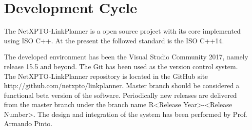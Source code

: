 
\chapter{Development Cycle}

The NetXPTO-LinkPlanner is a open source project with its core implemented using ISO C++.
At the present the followed standard is the ISO C++14.


The developed environment has been the Visual Studio Community 2017, namely release 15.5 and beyond.
The Git has been used as the version control system.
The NetXPTO-LinkPlanner repository is located in the GitHub site http://github.com/netxpto/linkplanner.
Master branch should be considered a functional beta version of the software.
Periodically new releases are delivered from the master branch under the branch name R<Release Year>-<Release Number>.
The design and integration of the system has been performed by Prof. Armando Pinto.




